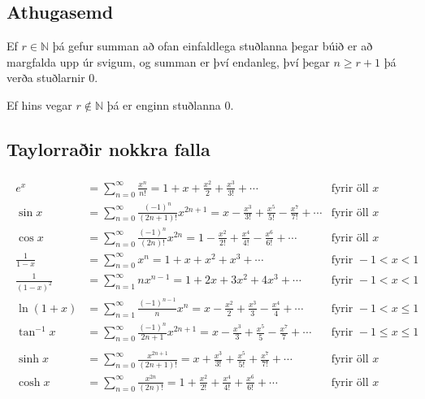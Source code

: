 \documentclass[a4paper,10pt,icelandic]{sphinxmanual}
\begin{document}
\subsection{Athugasemd}
\label{\detokenize{kafli10:id6}}
Ef \(r \in {{\mathbb  N}}\) þá gefur summan að ofan einfaldlega
stuðlanna þegar búið er að margfalda upp úr svigum, og summan er því
endanleg, því þegar \(n \geq r+1\) þá verða stuðlarnir 0.

Ef hins vegar \(r\notin {{\mathbb  N}}\) þá er enginn stuðlanna 0.


\subsection{Taylorraðir nokkra falla}
\label{\detokenize{kafli10:taylorrair-nokkra-falla}}\begin{equation*}
\begin{split}\begin{aligned}
e^x&=\sum_{n=0}^\infty\frac{x^n}{n!}
    =1+x+\frac{x^2}{2}+\frac{x^3}{3!}
    +\cdots
  &\mbox{fyrir öll }x\\
\sin x&=  \sum_{n=0}^\infty\frac{(-1)^n}{(2n+1)!}x^{2n+1}
    =x-\frac{x^3}{3!}+\frac{x^5}{5!}-\frac{x^7}{7!}+\cdots
    &\mbox{fyrir öll }x\\
\cos x&=  \sum_{n=0}^\infty\frac{(-1)^n}{(2n)!}x^{2n}
    =1-\frac{x^2}{2!}+\frac{x^4}{4!}-\frac{x^6}{6!}+\cdots
    &\mbox{fyrir öll }x\\
\frac{1}{1-x}&=\sum_{n=0}^\infty x^n
    =1+x+x^2+x^3+\cdots
&\mbox{fyrir }-1<x<1\\
\frac{1}{(1-x)^2}&=\sum_{n=1}^\infty nx^{n-1}
    =1+2x+3x^2+4x^3+\cdots
&\mbox{fyrir }-1<x<1\\
\ln(1+x)&=  \sum_{n=1}^\infty\frac{(-1)^{n-1}}{n}x^n
    =x-\frac{x^2}{2}+\frac{x^3}{3}-\frac{x^4}{4}+\cdots
    &\mbox{fyrir }-1<x\leq 1\\
\tan^{-1} x&=  \sum_{n=0}^\infty\frac{(-1)^n}{2n+1}x^{2n+1}
    =x-\frac{x^3}{3}+\frac{x^5}{5}-\frac{x^7}{7}+\cdots
    &\mbox{fyrir }-1\leq x\leq 1\\\\
\sinh x&=  \sum_{n=0}^\infty\frac{x^{2n+1}}{(2n+1)!}
    =x+\frac{x^3}{3!}+\frac{x^5}{5!}+\frac{x^7}{7!}+\cdots
    &\mbox{fyrir öll } x\\
\cosh x&=  \sum_{n=0}^\infty\frac{x^{2n}}{(2n)!}
    =1+\frac{x^2}{2!}+\frac{x^4}{4!}+\frac{x^6}{6!}+\cdots
    &\mbox{fyrir öll } x\\\end{aligned}\end{split}
\end{equation*}
\end{document}
